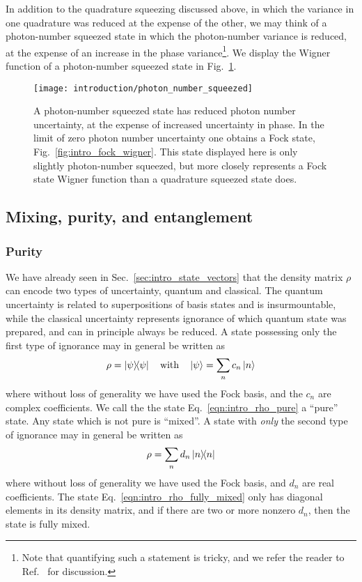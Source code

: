 In addition to the quadrature squeezing discussed above, in which the variance in one quadrature was reduced at the expense of the other, we may think of a photon-number squeezed state in which the photon-number variance is reduced, at the expense of an increase in the phase variance\footnote{Note that quantifying such a statement is tricky, and we refer the reader to Ref.~\cite{Barnett_red_book} for discussion.}. We display the Wigner function of a photon-number squeezed state in Fig.~\ref{fig:intro_photon_number_squeezed_wigner}.

\begin{figure}[htp]
\centering
\captionsetup{width=0.8\linewidth}
\texttt{[image: introduction/photon\_number\_squeezed]}
\caption{\label{fig:intro_photon_number_squeezed_wigner} A photon-number squeezed state has reduced photon number uncertainty, at the expense of increased uncertainty in phase. In the limit of zero photon number uncertainty one obtains a Fock state, Fig.~\ref{fig:intro_fock_wigner}. This state displayed here is only slightly photon-number squeezed, but more closely represents a Fock state Wigner function than a quadrature squeezed state does. }
\end{figure}



\FloatBarrier
\subsection{Mixing, purity, and entanglement}

\subsubsection{Purity}
We have already seen in Sec.~\ref{sec:intro_state_vectors} that the density matrix $\rho$ can encode two types of uncertainty, quantum and classical. The quantum uncertainty is related to superpositions of basis states and is insurmountable, while the classical uncertainty represents ignorance of which quantum state was prepared, and can in principle always be reduced. A state possessing only the first type of ignorance may in general be written as
\begin{equation}\label{eqn:intro_rho_pure}
\rho = \dyad{\psi} \qq{with} \ket{\psi} = \sum_n c_n \ket{n}
\end{equation}
where without loss of generality we have used the Fock basis, and the $c_n$ are complex coefficients. We call the the state Eq.~\ref{eqn:intro_rho_pure} a ``pure'' state. Any state which is not pure is ``mixed''. A state with \emph{only} the second type of ignorance may in general be written as
\begin{equation}\label{eqn:intro_rho_fully_mixed}
\rho = \sum_n d_n \dyad{n}
\end{equation}
where without loss of generality we have used the Fock basis, and $d_n$ are real coefficients. The state Eq.~\ref{eqn:intro_rho_fully_mixed} only has diagonal elements in its density matrix, and if there are two or more nonzero $d_n$, then the state is fully mixed.

